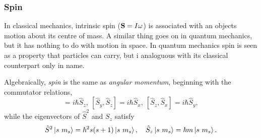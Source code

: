     \subsubsection{Spin}

    In classical mechanics, intrinsic spin ($\vb{S} = I\omega$) is associated with
    an objects motion about its centre of mass. A similar thing goes on in quantum 
    mechanics, but it has nothing to do with motion in space. In quantum mechanics spin 
    is seen as a property that particles can carry, but i analoguous with its classical 
    counterpart only in name.

    Algebraically, \emph{spin} is the same as \emph{angular momentum}, beginning with 
    the commutator relations,
    \begin{equation}
        [\hat{S}_x, \hat{S}_y] = i\hbar \hat{S}_z, \ 
        [\hat{S}_y, \hat{S}_z] = i\hbar \hat{S}_x, \ 
        [\hat{S}_z, \hat{S}_x] = i\hbar \hat{S}_y,
    \end{equation}
    while the eigenvectors of $\hat{S}^2$ and $S_z$ satisfy 
    \begin{equation}
        \hat{S}^2\ket{s\ m_s} = \hbar^2 s(s + 1)\ket{s\ m_s}, \quad
        \hat{S}_z\ket{s\ m_s} = \hbar m \ket{s\ m_s}.
    \end{equation}
   
